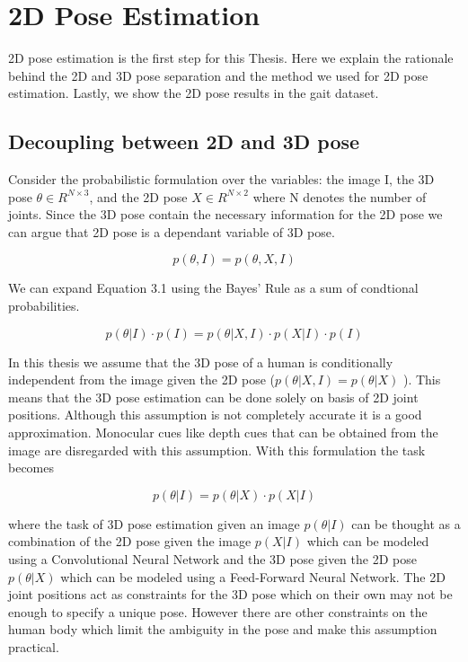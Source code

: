 
\chapter{2D Pose Estimation}\label{chapter:2dpose}

2D pose estimation is the first step for this Thesis. Here we explain the rationale behind the 2D and 3D pose separation and the method we used for 2D pose estimation. Lastly, we show the 2D pose results in the gait dataset. 

\section{Decoupling between 2D and 3D pose}

Consider the probabilistic formulation over the variables: the image I, the 3D pose $ \theta \in R^{N\times3} $, and the 2D pose $X \in R^{N\times2}$ where N denotes the number of joints. Since the 3D pose contain the necessary information for the 2D pose we can argue that 2D pose is a dependant variable of 3D pose.

\begin{equation}
    p(\theta,I) = p(\theta,X,I)
\end{equation}

We can expand Equation 3.1 using the Bayes' Rule as a sum of condtional probabilities. 

\begin{equation}
    p(\theta|I) \cdot p(I) = p(\theta|X,I) \cdot p(X|I) \cdot p(I)
\end{equation}

In this thesis we assume that the 3D pose of a human is conditionally independent from the image given the 2D pose ($p(\theta|X,I) = p(\theta|X)$ ). This means that the 3D pose estimation can be done solely on basis of 2D joint positions. Although this assumption is not completely accurate it is a good approximation. Monocular cues like depth cues that can be obtained from the image are disregarded with this assumption. With this formulation the task becomes 

\begin{equation}
    p(\theta|I) = p(\theta|X) \cdot p(X|I)
\end{equation} 

where the task of 3D pose estimation given an image $p(\theta|I)$ can be thought as a combination of the 2D pose given the image $p(X|I)$ which can be modeled using a Convolutional Neural Network and the 3D pose given the 2D pose $p(\theta|X)$ which can be modeled using a Feed-Forward Neural Network. The 2D joint positions act as constraints for the 3D pose which on their own may not be enough to specify a unique pose. However there are other constraints on the human body which limit the ambiguity in the pose and make this assumption practical. 

